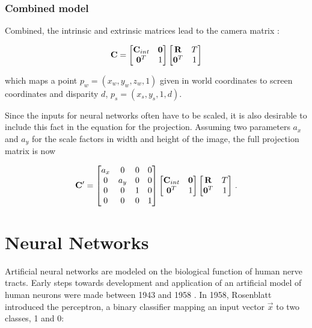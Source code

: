 		\subsubsection{Combined model}
			Combined, the intrinsic and extrinsic matrices lead to the camera matrix \cite{Szeliski2010}:
			
			\begin{equation}
			\mathbf{C} = \begin{bmatrix}\mathbf{C}_{int} & \mathbf{0}\\\mathbf{0}^T & 1\end{bmatrix}
			\begin{bmatrix}\mathbf{R} & T\\\mathbf{0}^T & 1\end{bmatrix}
			\end{equation}
			
			which maps a point $p_w = \left(x_w, y_w, z_w, 1\right)$ given in world coordinates to screen coordinates and disparity $d$, $p_s = \left(x_s, y_s, 1, d\right)$.
			
			Since the inputs for neural networks often have to be scaled, it is also desirable to include this fact in the equation for the projection. Assuming two parameters $a_x$ and $a_y$ for the scale factors in width and height of the image, the full projection matrix is now
			
			\begin{equation}
			\mathbf{C}' = \begin{bmatrix}a_x & 0 & 0 & 0\\ 0 & a_y & 0 & 0\\0 & 0 & 1 & 0\\0 & 0 & 0 & 1\end{bmatrix} \begin{bmatrix}\mathbf{C}_{int} & \mathbf{0}\\\mathbf{0}^T & 1\end{bmatrix}
			\begin{bmatrix}\mathbf{R} & T\\\mathbf{0}^T & 1\end{bmatrix} \,.
			\end{equation}
		
\section { Neural Networks }
	Artificial neural networks 	are modeled on the biological function of human nerve tracts. Early steps towards development and application of an artificial model of human neurons were made between 1943 and 1958 \cite{McCulloch1943, ROSENBLATT1958}. In 1958, Rosenblatt introduced the perceptron, a binary classifier mapping an input vector $\vec{x}$ to two classes, 1 and 0:
	
